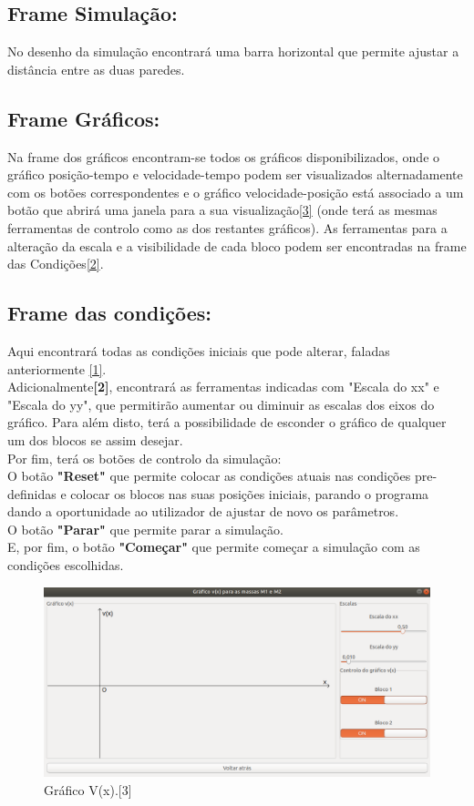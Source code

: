 \documentclass{article}
\begin{document}
\subsection {Frame Simulação:}
No desenho da simulação encontrará uma barra horizontal que permite ajustar a distância entre as duas paredes.
\subsection {Frame Gráficos:}
Na frame dos gráficos encontram-se todos os gráficos disponibilizados, onde o gráfico posição-tempo e velocidade-tempo podem ser visualizados alternadamente com os botões correspondentes e o gráfico velocidade-posição está associado a um botão que abrirá uma janela para a sua visualização\hyperlink{mylink3}{[3]} (onde terá as mesmas ferramentas de controlo como as dos restantes gráficos). As ferramentas para a alteração da escala e a visibilidade de cada bloco podem ser encontradas na frame das Condições\hyperlink{mylink2}{[2]}. 
\subsection{Frame das condições:}
Aqui encontrará todas as condições iniciais que pode alterar, faladas anteriormente \hyperlink{mylink}{[1]}.\\
Adicionalmente\hypertarget{mylink2}{\textbf{[2]}}, encontrará as ferramentas indicadas com "Escala do xx" e "Escala do yy", que permitirão aumentar ou diminuir as escalas dos eixos do gráfico. Para além disto, terá a possibilidade de esconder o gráfico de qualquer um dos blocos se assim desejar.\\
Por fim, terá os botões de controlo da simulação:\\ 
O botão \textbf{"Reset"} que permite colocar as condições atuais nas condições pre-definidas e colocar os blocos nas suas posições iniciais, parando o programa dando a oportunidade ao utilizador de ajustar de novo os parâmetros.\\
O botão \textbf{"Parar"} que permite parar a simulação.\\
E, por fim, o botão \textbf{"Começar"} que permite começar a simulação com as condições escolhidas.


\begin{figure}[h!]
\centering
\includegraphics[scale=0.30]{FINAL2.png}
\caption{Gráfico V(x).\hypertarget{mylink3}{[3]}}
\label{fig:Programa}
\end{figure}
\end{document}
